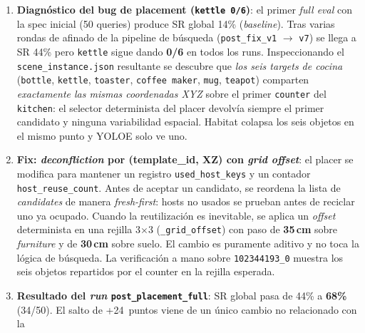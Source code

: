 \documentclass[11pt,a4paper]{article}
\begin{document}
\begin{enumerate}
{        \texttt{object\_priors.py} con los nuevos targets nivel-3}: se
        añaden entradas para \texttt{kettle}, \texttt{toaster},
        \texttt{coffee maker}, \texttt{mug}, \texttt{trash bin},
        \texttt{printer}, \texttt{basketball}, etc., tanto en la
        \texttt{\_MANUAL\_TABLE} como en la tabla de
        co-ocurrencia y en los \texttt{\_SEMANTIC\_ALIASES}. El cambio
        es aditivo: ningún prior existente se modifica.
  \item \textbf{Diagnóstico del bug de placement (\texttt{kettle 0/6})}:
        el primer \emph{full eval} con la spec inicial (50 queries)
        produce SR global 14\% (\emph{baseline}). Tras varias rondas
        de afinado de la pipeline de búsqueda (\texttt{post\_fix\_v1}
        $\rightarrow$ \texttt{v7}) se llega a SR 44\% pero
        \texttt{kettle} sigue dando \textbf{0/6} en todos los runs.
        Inspeccionando el \texttt{scene\_instance.json} resultante se
        descubre que \emph{los seis \emph{targets} de cocina}
        (\texttt{bottle}, \texttt{kettle}, \texttt{toaster},
        \texttt{coffee\,maker}, \texttt{mug}, \texttt{teapot})
        comparten \emph{exactamente las mismas coordenadas XYZ} sobre
        el primer \texttt{counter} del \texttt{kitchen}: el selector
        determinista del placer devolvía siempre el primer candidato y
        ninguna variabilidad espacial. Habitat colapsa los seis objetos
        en el mismo punto y YOLOE solo ve uno.
  \item \textbf{Fix: \emph{deconfliction} por (template\_id, XZ) con
        \emph{grid offset}}: el placer se modifica para mantener un
        registro \texttt{used\_host\_keys} y un contador
        \texttt{host\_reuse\_count}. Antes de aceptar un candidato, se
        reordena la lista de \emph{candidates} de manera
        \emph{fresh-first}: hosts no usados se prueban antes de reciclar
        uno ya ocupado. Cuando la reutilización es inevitable, se aplica
        un \emph{offset} determinista en una rejilla 3$\times$3
        (\texttt{\_grid\_offset}) con paso de \textbf{35\,cm} sobre
        \emph{furniture} y de \textbf{30\,cm} sobre suelo. El cambio es
        puramente aditivo y no toca la lógica de búsqueda. La
        verificación a mano sobre \texttt{102344193\_0} muestra los
        seis objetos repartidos por el counter en la rejilla esperada.
  \item \textbf{Resultado del \emph{run} \texttt{post\_placement\_full}}:
        SR global pasa de 44\% a \textbf{68\%} (34/50). El salto de
        +24~puntos viene de un único cambio no relacionado con la

\end{enumerate}
\end{document}
